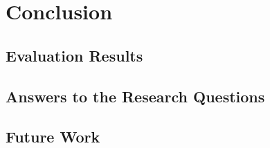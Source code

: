 \chapter{Conclusion}

\section{Evaluation Results}

\section{Answers to the Research Questions}

\section{Future Work}